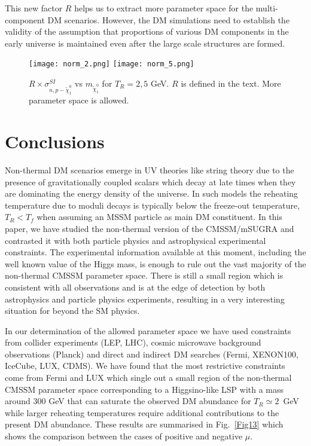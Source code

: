 \documentclass[11pt,a4paper]{article}
\begin{document}
This new factor $R$ helps us to extract more parameter space for the multi-component DM scenarios. However, the DM simulations need to establish the validity of  the assumption that proportions of various DM components in the early universe is maintained even after the large scale structures are formed.


\begin{figure}[!ht]
\centering
\texttt{[image: norm\_2.png]}
\texttt{[image: norm\_5.png]}
\caption{$R\times\sigma^{SI}_{n,p-\tilde\chi^0_1}$ vs $m_{\tilde\chi^0_1}$ for $T_R=2, 5$ GeV. $R$ is defined in the text. More parameter space is allowed.}
\label{Fig15}
\end{figure}

\FloatBarrier




\section{Conclusions}

Non-thermal DM scenarios emerge in UV theories like string theory due to the presence of gravitationally coupled scalars which decay at late times when they are dominating the energy density of the universe. In such models the reheating temperature due to moduli decays is typically below the freeze-out temperature, $T_R<T_f$ when assuming an MSSM particle as main DM constituent. In this paper, we have studied the non-thermal version of the CMSSM/mSUGRA and contrasted it with both particle physics and astrophysical experimental constraints. The experimental information available at this moment, including the well known value of the Higgs mass, is enough to rule out the vast majority of the non-thermal CMSSM parameter space. There is still a small region which is consistent with all observations and is at the edge of detection by both astrophysics and particle physics experiments, resulting in a very interesting situation for beyond the SM physics.

In our determination of the allowed parameter space we have used constraints from collider experiments (LEP, LHC), cosmic microwave background observations (Planck) and direct and indirect DM searches (Fermi, XENON100, IceCube, LUX, CDMS). We have found that the most restrictive constraints come from Fermi and LUX which single out a small region of the non-thermal CMSSM parameter space corresponding to a Higgsino-like LSP with a mass around $300$ GeV that can saturate the observed DM abundance for $T_R\simeq 2$~GeV while larger reheating temperatures require additional contributions to the present DM abundance.
These results are summarised in Fig.~\ref{Fig13} which shows the comparison between the cases of positive and negative $\mu$.
\end{document}
